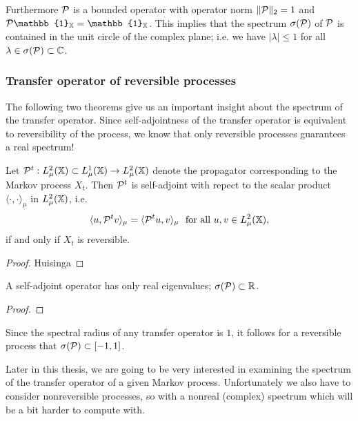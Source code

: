 Furthermore $\mathcal{P}$ is a bounded operator with operator norm $\Vert \mathcal{P} \Vert_2 =1$  and $\Pcal  \mathbb{1}_\X = \mathbb{1}_\X$. This implies that the spectrum $\sigma(\mathcal{P})$ of $\mathcal{P}$ is contained in the unit circle of the complex plane; i.e. we have $| \lambda | \leq 1$ for all $\lambda \in \sigma(\mathcal{P}) \subset \mathbb{C}$. 

\subsubsection*{Transfer operator of reversible processes}

The following two theorems give us an important insight about the spectrum of the transfer operator. Since self-adjointness of the transfer operator is equivalent to reversibility of the process, we know that only reversible processes guarantees a real spectrum!

\begin{thm}
\label{thm:selfadjoint_reversible}
Let $\mathcal{P}^t: L_\mu^2(\mathbb{X}) \subset L_\mu^1(\mathbb{X}) \rightarrow L_\mu^2(\mathbb{X})$ denote the propagator corresponding to the Markov process $X_t$. Then $\mathcal{P}^t$ is self-adjoint with repect to the scalar product $\langle \cdot, \cdot \rangle_\mu$ in $L_\mu^2(\mathbb{X})$, i.e.
\begin{equation*}
\langle u, \mathcal{P}^t v \rangle_\mu = \langle \mathcal{P}^t u, v \rangle_\mu \ \textrm{ for all } u,v \in L_\mu^2(\mathbb{X}),
\end{equation*}
if and only if $X_t$ is reversible.
\end{thm}
\begin{proof}
Huisinga\cite{huisinga2001metastability}
\end{proof}

\begin{thm}
\label{thm:selfadjoint_real}
A self-adjoint operator has only real eigenvalues; $\sigma(\mathcal{P}) \subset \mathbb{R}$.
\end{thm}
\begin{proof}
\end{proof}
Since the spectral radius of any transfer operator is $1$, it follows for a reversible process that $\sigma(\mathcal{P}) \subset [-1, 1]$.

Later in this thesis, we are going to be very interested in examining the spectrum of the transfer operator of a given Markov process. Unfortunately we also have to consider nonreversible processes, so with a nonreal (complex) spectrum which will be a bit harder to compute with.

